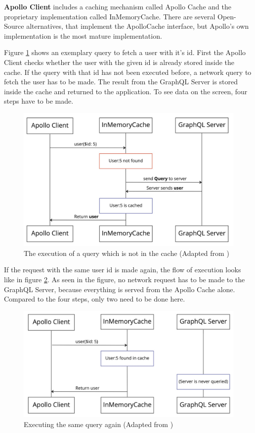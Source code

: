 \textbf{Apollo Client} includes a caching mechanism called Apollo Cache and the proprietary implementation called InMemoryCache. There are several Open-Source alternatives, that implement the ApolloCache interface, but Apollo's own implementation is the most mature implementation.

Figure \ref{figure:background:graphql:user-query-first-time} shows an exemplary query to fetch a user with it's id. First the Apollo Client checks whether the user with the given id is already stored inside the cache. If the query with that id has not been executed before, a network query to fetch the user has to be made. The result from the GraphQL Server is stored inside the cache and returned to the application. To see data on the screen, four steps have to be made. \cite{misc:-:background:graphql:apollo-client-cache-overview}

\ifshowImages
  \begin{figure}[H]
  \centering
  \includegraphics[width=0.6\linewidth]{images/background/apollo/apollo-client-basic-cache.jpeg}
  \caption{The execution of a query which is not in the cache (Adapted from \cite{misc:-:background:graphql:apollo-client-cache-overview})}\label{figure:background:graphql:user-query-first-time}
  \end{figure}
\fi

If the request with the same user id is made again, the flow of execution looks like in figure \ref{figure:background:graphql:user-query-second-time}. As seen in the figure, no network request has to be made to the GraphQL Server, because everything is served from the Apollo Cache alone. Compared to the four steps, only two need to be done here. \cite{misc:-:background:graphql:apollo-client-cache-overview}

\ifshowImages
  \begin{figure}[H]
  \centering
  \includegraphics[width=0.6\linewidth]{images/background/apollo/apollo-client-basic-cache-warm.jpeg}
  \caption{Executing the same query again (Adapted from \cite{misc:-:background:graphql:apollo-client-cache-overview})}\label{figure:background:graphql:user-query-second-time}
  \end{figure}
\fi

